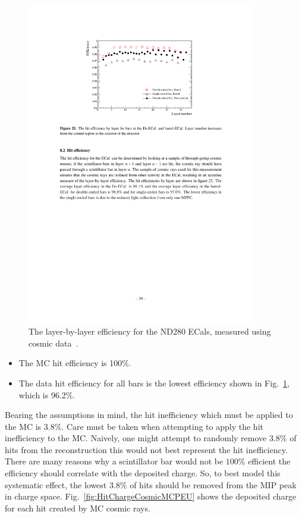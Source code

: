 \begin{figure}[t!]
  \centering
  \includegraphics[width=10cm]{images/measurement/systematics/detector/threshold/layer_efficiency_cosmics_data.pdf}
  \caption{The layer-by-layer efficiency for the ND280 ECals, measured using cosmic data~\cite{1748-0221-8-10-P10019}.}
  \label{fig:LayerEfficiencyCosmicData}
\end{figure}
\begin{itemize}
\item The MC hit efficiency is 100$\%$.
\item The data hit efficiency for all bars is the lowest efficiency shown in Fig.~\ref{fig:LayerEfficiencyCosmicData}, which is 96.2$\%$.
\end{itemize}
Bearing the assumptions in mind, the hit inefficiency which must be applied to the MC is 3.8$\%$.  Care must be taken when attempting to apply the hit inefficiency to the MC.  Naively, one might attempt to randomly remove 3.8$\%$ of hits from the reconstruction this would not best represent the hit inefficiency.  There are many reasons why a scintillator bar would not be $100\%$ efficient the efficiency should correlate with the deposited charge.  So, to best model this systematic effect, the lowest 3.8$\%$ of hits should be removed from the MIP peak in charge space.  Fig.~\ref{fig:HitChargeCosmicMCPEU} shows the deposited charge for each hit created by MC cosmic rays.
